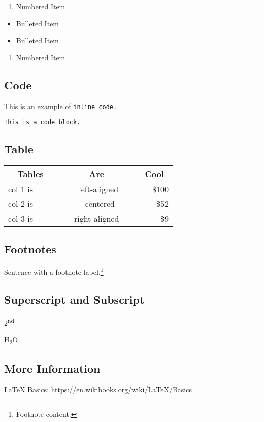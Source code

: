 \begin{enumerate}
\def\labelenumi{\arabic{enumi}.}
\item
  Numbered Item
\end{enumerate}

\begin{itemize}
\item
  Bulleted Item\\
\item
  Bulleted Item\\
\end{itemize}

\begin{enumerate}
\def\labelenumi{\arabic{enumi}.}
\setcounter{enumi}{1}
\item
  Numbered Item
\end{enumerate}

\subsection{Code}

This is an example of \texttt{inline\ code.}

\texttt{This\ is\ a\ code\ block.}

\subsection{Table}

\begin{longtable}[]{@{}lcr@{}}
\toprule
~~Tables~~ & ~~~~~~Are~~~~~~ & ~Cool~\tabularnewline
\midrule
\endhead
col 1 is & ~left-aligned & \$100\tabularnewline
col 2 is & ~~~ centered~~ & ~\$52\tabularnewline
col 3 is & right-aligned & ~~\$9\tabularnewline
\bottomrule
\end{longtable}

\subsection{Footnotes}

Sentence with a footnote label.\footnote{Footnote content.}

\subsection{Superscript and Subscript}

2\textsuperscript{nd}

H\textsubscript{2}O

\subsection{More Information}

LaTeX Basics: https://en.wikibooks.org/wiki/LaTeX/Basics
